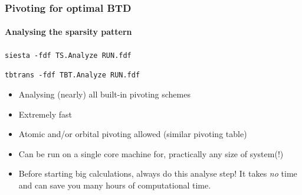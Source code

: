 \begin{frame}
  \frametitle{Pivoting for optimal BTD}
  \framesubtitle{Analysing the sparsity pattern}

  \begin{center}
    \texttt{siesta -fdf TS.Analyze RUN.fdf}

    \texttt{tbtrans -fdf TBT.Analyze RUN.fdf}

  \end{center}

  \begin{itemize}[<+->]
    \item Analysing (nearly) all built-in pivoting schemes

    \item Extremely fast

    \item Atomic and/or orbital pivoting allowed (similar pivoting table)

    \item Can be run on a single core machine for, practically any size of system(!)

    \item Before starting big calculations, always do this analyse step! It takes
    \emph{no} time and can save you many hours of computational time.

  \end{itemize}

\end{frame}



